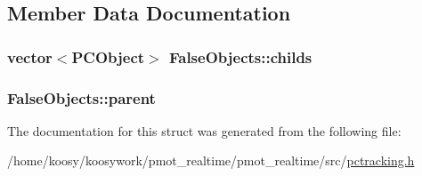 \subsection{\-Member \-Data \-Documentation}
\hypertarget{struct_false_objects_a92ed26914ae6e1b3b628418e13eca43d}{
\subsubsection[{childs}]{\setlength{\rightskip}{0pt plus 5cm}vector$<${\bf \-P\-C\-Object}$>$ {\bf \-False\-Objects\-::childs}}}\label{struct_false_objects_a92ed26914ae6e1b3b628418e13eca43d}
\hypertarget{struct_false_objects_a72516a38ec12f2afd7fa072705ba7fd7}{
\subsubsection[{parent}]{ {\bf \-False\-Objects\-::parent}}}\label{struct_false_objects_a72516a38ec12f2afd7fa072705ba7fd7}


\-The documentation for this struct was generated from the following file\-:\begin{DoxyCompactItemize}
\item 
/home/koosy/koosywork/pmot\-\_\-realtime/pmot\-\_\-realtime/src/\hyperlink{pctracking_8h}{pctracking.\-h}\end{DoxyCompactItemize}
